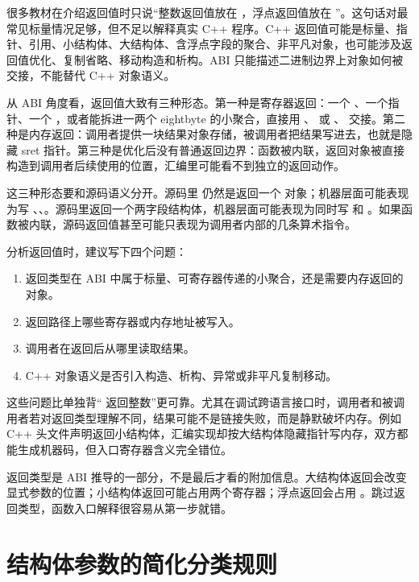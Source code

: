 很多教材在介绍返回值时只说“整数返回值放在 ，浮点返回值放在 ”。这句话对最常见标量情况足够，但不足以解释真实 C++ 程序。C++ 返回值可能是标量、指针、引用、小结构体、大结构体、含浮点字段的聚合、非平凡对象，也可能涉及返回值优化、复制省略、移动构造和析构。ABI 只能描述二进制边界上对象如何被交接，不能替代 C++ 对象语义。

从 ABI 角度看，返回值大致有三种形态。第一种是寄存器返回：一个 、一个指针、一个 ，或者能拆进一两个 eightbyte 的小聚合，直接用 、 或 、 交接。第二种是内存返回：调用者提供一块结果对象存储，被调用者把结果写进去，也就是隐藏 sret 指针。第三种是优化后没有普通返回边界：函数被内联，返回对象被直接构造到调用者后续使用的位置，汇编里可能看不到独立的返回动作。

这三种形态要和源码语义分开。源码里  仍然是返回一个  对象；机器层面可能表现为写 \code{[rdi]}、\code{[rdi + 8]}、\code{[rdi + 16]}。源码里返回一个两字段结构体，机器层面可能表现为同时写  和 。如果函数被内联，源码返回值甚至可能只表现为调用者内部的几条算术指令。

分析返回值时，建议写下四个问题：

\begin{enumerate}
  \item 返回类型在 ABI 中属于标量、可寄存器传递的小聚合，还是需要内存返回的对象。
  \item 返回路径上哪些寄存器或内存地址被写入。
  \item 调用者在返回后从哪里读取结果。
  \item C++ 对象语义是否引入构造、析构、异常或非平凡复制移动。
\end{enumerate}

这些问题比单独背“ 返回整数”更可靠。尤其在调试跨语言接口时，调用者和被调用者若对返回类型理解不同，结果可能不是链接失败，而是静默破坏内存。例如 C++ 头文件声明返回小结构体，汇编实现却按大结构体隐藏指针写内存，双方都能生成机器码，但入口寄存器含义完全错位。

\begin{warningbox}
返回类型是 ABI 推导的一部分，不是最后才看的附加信息。大结构体返回会改变显式参数的位置；小结构体返回可能占用两个寄存器；浮点返回会占用 。跳过返回类型，函数入口解释很容易从第一步就错。
\end{warningbox}

\section{结构体参数的简化分类规则}

